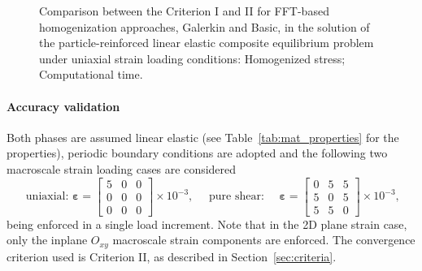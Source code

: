 \begin{figure}[hbt]
\begin{subfigure}[b]{0.46\textwidth}
    \caption{}
    \label{subfig:linear_3D_normal_comparison_crit_cpu_time_vs_n_voxels}
  \end{subfigure}
  \caption{Comparison between the Criterion I and II for FFT-based homogenization
  approaches, Galerkin and Basic, in the solution of the particle-reinforced linear elastic
  composite equilibrium problem under uniaxial strain loading conditions:
   Homogenized
  stress; 
  Computational time.} \label{fig:linear_3D_normal_comparison_crit}
\end{figure}

\FloatBarrier

\paragraph{Accuracy validation}
Both phases are assumed linear elastic (see Table~\ref{tab:mat_properties} for the properties), periodic boundary conditions are adopted and the following two macroscale strain loading cases are considered
\begin{equation}
\text { uniaxial: } \bm{\varepsilon}=\left[\begin{array}{lll}
5 & 0 & 0 \\
0 & 0 & 0 \\
0 & 0 & 0
\end{array}\right] \times 10^{-3}, \quad \text { pure shear: } \quad \bm \varepsilon=\left[\begin{array}{ccc}
0 & 5 & 5 \\
5 & 0 & 5 \\
5 & 5 & 0
\end{array}\right] \times 10^{-3},
\end{equation}
being enforced in a single load increment.
Note that in the 2D plane strain case, only the inplane \(O_{x y}\) macroscale strain components are enforced.
The convergence criterion used is Criterion II, as described in Section~\ref{sec:criteria}.

